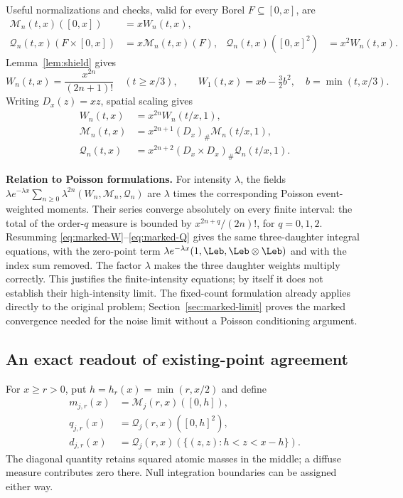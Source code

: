 \documentclass[11pt,letterpaper]{article}
\begin{document}
Useful normalizations and checks, valid for every Borel $F\subseteq[0,x]$,
are
\begin{align}
 \mathcal M_n(t,x)([0,x])&=xW_n(t,x),\nonumber\\
 \mathcal Q_n(t,x)(F\times[0,x])&=x\mathcal M_n(t,x)(F),
 &\mathcal Q_n(t,x)([0,x]^2)&=x^2W_n(t,x).\label{eq:marked-mass}
\end{align}
Lemma~\ref{lem:shield} gives
\[
 W_n(t,x)=\frac{x^{2n}}{(2n+1)!}\quad(t\ge x/3),\qquad
 W_1(t,x)=xb-\tfrac32b^2,\quad b=\min(t,x/3).
\]
Writing $D_x(z)=xz$, spatial scaling gives
\begin{align*}
 W_n(t,x)&=x^{2n}W_n(t/x,1),\\
 \mathcal M_n(t,x)&=x^{2n+1}(D_x)_\#\mathcal M_n(t/x,1),\\
 \mathcal Q_n(t,x)&=x^{2n+2}(D_x\times D_x)_\#\mathcal Q_n(t/x,1).
\end{align*}

\textbf{Relation to Poisson formulations.}
For intensity $\lambda$, the fields
$\lambda e^{-\lambda x}\sum_{n\ge0}\lambda^{2n}
(W_n,\mathcal M_n,\mathcal Q_n)$ are $\lambda$ times the
corresponding Poisson event-weighted moments. Their series converge
absolutely on every finite interval: the total of the order-$q$ measure
is bounded by $x^{2n+q}/(2n)!$, for $q=0,1,2$.
Resumming \eqref{eq:marked-W}--\eqref{eq:marked-Q} gives the same
three-daughter integral equations, with the zero-point term
$\lambda e^{-\lambda x}(1,\Leb,\Leb\otimes\Leb)$ and with the index
sum removed. The factor $\lambda$ makes the three daughter weights
multiply correctly. This justifies the finite-intensity equations;
by itself it does not establish their high-intensity limit. The
fixed-count formulation already applies directly to the original
problem; Section~\ref{sec:marked-limit} proves the marked convergence
needed for the noise limit without a Poisson conditioning argument.

\subsection{An exact readout of existing-point agreement}
\label{sec:readout}

For $x\ge r>0$, put $h=h_r(x)=\min(r,x/2)$ and define
\begin{align*}
 m_{j,r}(x)&=\mathcal M_j(r,x)([0,h]),\\
 q_{j,r}(x)&=\mathcal Q_j(r,x)([0,h]^2),\\
 d_{j,r}(x)&=\mathcal Q_j(r,x)
       (\{(z,z):h<z<x-h\}).
\end{align*}
The diagonal quantity retains squared atomic masses in the middle; a
diffuse measure contributes zero there. Null integration boundaries can
be assigned either way.
\end{document}
